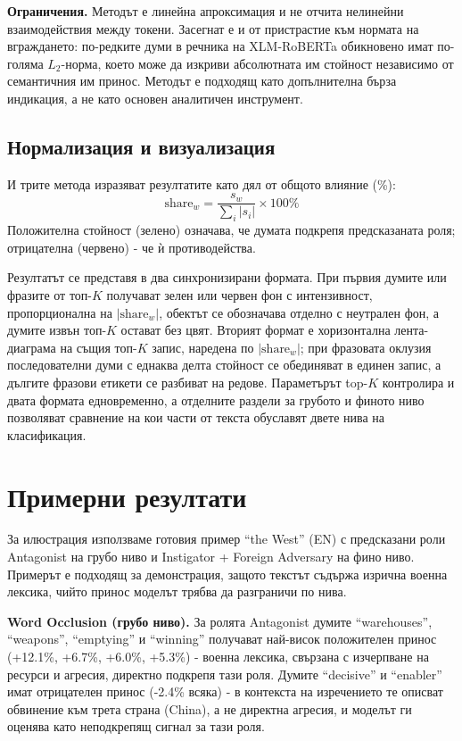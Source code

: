 \documentclass[12pt,a4paper]{report}
\begin{document}
\textbf{Ограничения.} Методът е линейна апроксимация и не отчита нелинейни взаимодействия между токени. Засегнат е и от пристрастие към нормата на вграждането: по-редките думи в речника на XLM-RoBERTa обикновено имат по-голяма $L_2$-норма, което може да изкриви абсолютната им стойност независимо от семантичния им принос. Методът е подходящ като допълнителна бърза индикация, а не като основен аналитичен инструмент.


\subsection{Нормализация и визуализация}
\label{sec:saliency_viz}

И трите метода изразяват резултатите като дял от общото влияние (\%):
\begin{equation}
  \text{share}_w = \frac{s_w}{\displaystyle\sum_{i} |s_i|} \times 100\%
  \label{eq:share}
\end{equation}
Положителна стойност (зелено) означава, че думата подкрепя предсказаната роля; отрицателна (червено) - че ѝ противодейства.

Резултатът се представя в два синхронизирани формата. При първия думите или фразите от топ-$K$ получават зелен или червен фон с интензивност, пропорционална на $|\text{share}_w|$, обектът се обозначава отделно с неутрален фон, а думите извън топ-$K$ остават без цвят. Вторият формат е хоризонтална лента-диаграма на същия топ-$K$ запис, наредена по $|\text{share}_w|$; при фразовата оклузия последователни думи с еднаква делта стойност се обединяват в единен запис, а дългите фразови етикети се разбиват на редове. Параметърът top-$K$ контролира и двата формата едновременно, а отделните раздели за грубото и финото ниво позволяват сравнение на кои части от текста обуславят двете нива на класификация.

\section{Примерни резултати}
\label{sec:saliency_examples}

За илюстрация използваме готовия пример ``the West'' (EN) с предсказани роли Antagonist на грубо ниво и Instigator + Foreign Adversary на фино ниво. Примерът е подходящ за демонстрация, защото текстът съдържа изрична военна лексика, чийто принос моделът трябва да разграничи по нива.

\textbf{Word Occlusion (грубо ниво).} За ролята Antagonist думите ``warehouses'', ``weapons'', ``emptying'' и ``winning'' получават най-висок положителен принос (+12.1\%, +6.7\%, +6.0\%, +5.3\%) - военна лексика, свързана с изчерпване на ресурси и агресия, директно подкрепя тази роля. Думите ``decisive'' и ``enabler'' имат отрицателен принос (-2.4\% всяка) - в контекста на изречението те описват обвинение към трета страна (China), а не директна агресия, и моделът ги оценява като неподкрепящ сигнал за тази роля.
\end{document}
